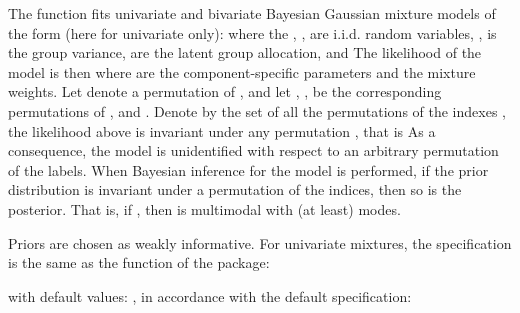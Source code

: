\documentclass[a4paper]{book}
\begin{document}
\begin{Details}\relax
The function fits univariate and bivariate Bayesian Gaussian mixture models of the form
(here for univariate only):
where the , , are i.i.d. random variables, ,
 is the group variance,   are the
latent group allocation, and
The likelihood of the model is then
where 
are the component-specific parameters and 
the mixture weights. Let \eqn{\nu}{} denote a permutation of ,
and let  ,
 ,
 be the
corresponding permutations of \eqn{\mu}{}, \eqn{\phi}{} and \eqn{\pi}{}.
Denote by  the set of all the permutations of the indexes
, the likelihood above is invariant under any
permutation , that is
As a consequence, the model is unidentified with respect to an
arbitrary permutation of the labels.
When Bayesian inference for the model is performed,
if the prior distribution  is invariant under a permutation of the indices, then so is the posterior. That is, if , then
is multimodal with (at least)  modes.

Priors are chosen as weakly informative. For univariate mixtures,
the specification is the same as the function  of the
 package:


with default values: , in accordance with the default
specification:



\end{Details}
\end{document}

